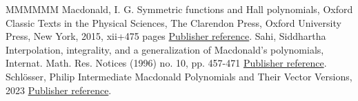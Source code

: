 \documentclass[11pt]{article}
\theoremstyle{definition}
\numberwithin{equation}{section}
\begin{document}
\begin{thebibliography}{MMMMMM}
 Macdonald, I. G. Symmetric functions and Hall polynomials, Oxford Classic Texts in the Physical Sciences, The Clarendon Press, Oxford University Press, New York, 2015, xii+475 pages \href{https://alco.centre-mersenne.org/articles/10.5802/alco.388/#MR3443860}{Publisher reference}.
 Sahi, Siddhartha Interpolation, integrality, and a generalization of Macdonald’s polynomials, Internat. Math. Res. Notices (1996) no. 10, pp. 457-471 \href{https://alco.centre-mersenne.org/articles/10.5802/alco.388/#MR1399411}{Publisher reference}.
 Schlösser, Philip Intermediate Macdonald Polynomials and Their Vector Versions, 2023 \href{https://alco.centre-mersenne.org/articles/10.5802/alco.388/#Schlosser}{Publisher reference}.
\end{thebibliography}
\end{document}
